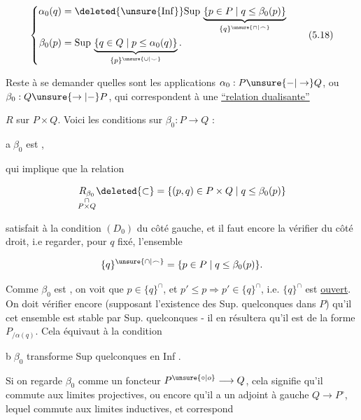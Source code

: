 \[
 \left\{\begin{aligned}
 \alpha_0(q)&=\deleted{\unsure{\mathrm{Inf}}}\mathrm{Sup}\,
 \underbrace{\{p\in P\mid q\leq\beta_0(p)\}}_{\{q\}^{\unsure{\cap|\frown}}}\\
 \beta_0(p)&=\mathrm{Sup}\,
 \underbrace{\{q\in Q\mid p\leq\alpha_0(q)\}}_{\{p\}^{\unsure{\cup|\smile}}}.
 \end{aligned}\right.
 \tag*{(5.18)}
\]

Reste à se demander quelles sont les applications $\alpha_0:P\unsure{-|\to}Q$, ou $\beta_0:Q\unsure{\to|-}P$, qui correspondent à une \uline{``relation dualisante''}

$R$ sur $P\times Q$. Voici les conditions sur $\beta_0:P\to Q$ :

\textcircled{a}\quad $\beta_0$ est \uline{},

  qui implique que la relation

\[
 \underset{\substack{\cap\\P\times Q}}{R_{\beta_0}}\deleted{\subset}
 =\{(p,q)\in P\times Q\mid q\leq\beta_0(p)\}
\]

satisfait à la condition $(D_0)$ du côté gauche, et il faut encore la vérifier du côté droit, i.e regarder, pour $q$ fixé, l'ensemble

\[
 \{q\}^{\unsure{\cap|\frown}}=\{p\in P\mid q\leq\beta_0(p)\}.
\]

Comme $\beta_0$ est , on voit que  $p\in\{q\}^\cap$, et $p'\leq p\Longrightarrow p'\in\{q\}^\cap$, i.e. $\{q\}^\cap$ est \uline{ouvert}.  On doit vérifier encore (supposant l'existence des Sup. quelconques dans $P$) qu'il  cet ensemble est stable par  Sup. quelconques - il en résultera qu'il est de la forme $P_{/\alpha(q)}$. Cela équivaut à la condition

\textcircled{b}\quad $\beta_0$ transforme Sup quelconques  en Inf .

\deleted{\unsure{(}} Si on regarde $\beta_0$ comme un  foncteur $P^{\unsure{\circ|o}}\longrightarrow Q$, cela signifie qu'il commute aux limites projectives, ou encore qu'il a un adjoint à gauche $Q\longrightarrow P^\circ$, lequel commute aux limites inductives, et correspond

